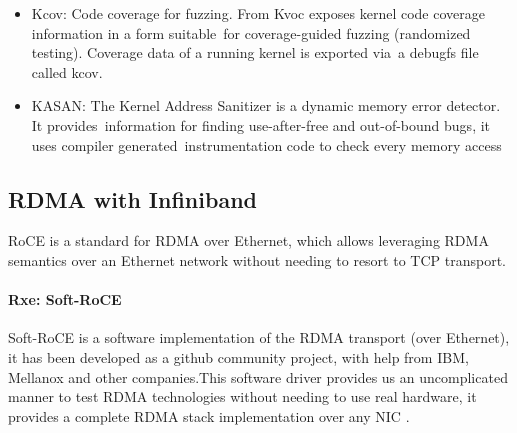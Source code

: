 \begin{itemize}
    \item Kcov: Code coverage for fuzzing. From \cite{kerneldocs-kcov} Kvoc exposes kernel code coverage information in a form suitable\
    for coverage-guided fuzzing (randomized testing). Coverage data of a running kernel is exported via\
    a debugfs file called kcov. %
    \item KASAN: The Kernel Address Sanitizer is a dynamic memory error detector. It provides\
    information for finding use-after-free and out-of-bound bugs, it uses compiler generated\
    instrumentation code to check every memory access \cite{kerneldocs-kasan} %
\end{itemize}

\subsection{RDMA with Infiniband}

RoCE is a standard for RDMA over Ethernet, which allows leveraging RDMA semantics over an Ethernet network without needing
to resort to TCP transport. 
\paragraph{Rxe: Soft-RoCE}

Soft-RoCE is a software implementation of the RDMA transport (over Ethernet), it has been developed as a github 
community project, with help from IBM, Mellanox and other companies.This software driver provides us an 
uncomplicated manner to test RDMA technologies without needing to use real hardware, it provides a complete RDMA 
stack implementation over any NIC \cite{mellanox-community}.


